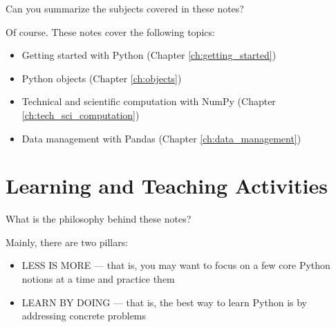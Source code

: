 \documentclass[a4paper,11pt]{book}
\newcommand{\question}[1]{%
    \begin{tcolorbox}[colback=comp_c!10,colframe=comp_c,sidebyside align=top,width=\linewidth,before skip=1ex]
        #1
    \end{tcolorbox}
    \switchcolumn%
}
\newcommand{\note}[1]{%
    \begin{tcolorbox}[colback=white!0,colframe=white!10,width=\linewidth,before skip=1ex]
        #1
    \end{tcolorbox}
}
\begin{document}
\begin{paracol}{2}
	\question{\raggedright Can you summarize the subjects covered in these notes?}
	\note{Of course. These notes cover the following topics:
	
	\begin{itemize}
		\item Getting started with Python (Chapter \ref{ch:getting_started})
		\item Python objects (Chapter \ref{ch:objects})
		\item Technical and scientific computation with NumPy (Chapter \ref{ch:tech_sci_computation})
		\item Data management with Pandas (Chapter \ref{ch:data_management})
	\end{itemize}
	}
\end{paracol}

\section{Learning and Teaching Activities}

\begin{paracol}{2}
	\question{\raggedright What is the philosophy behind these notes?}
	\note{Mainly, there are two pillars:
	
	\begin{itemize}
		\item LESS IS MORE --- that is, you may want to focus on a few core Python notions at a time and practice them
		\item LEARN BY DOING --- that is, the best way to learn Python is by addressing concrete problems
	\end{itemize}
	
	}
\end{paracol}
\clearpage
\end{document}
